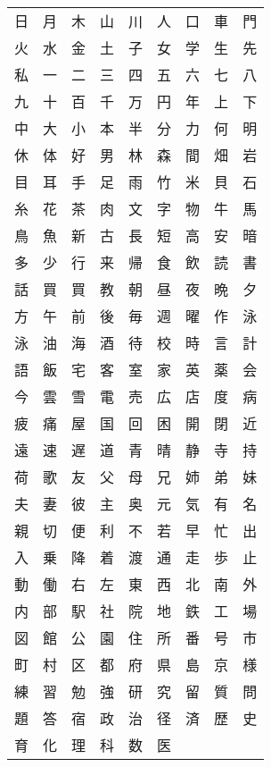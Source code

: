 \documentclass{article}
\newcommand{\tn}{\tabularnewline}
\begin{document}
\begin{CJK}{UTF8}{meiryo}
  \fontsize{18}
  \selectfont
  \begin{center}
    \thispagestyle{empty}
    \begin{tabular}{x{1.7cm}x{1.7cm}x{1.7cm}x{1.7cm}x{1.7cm}x{1.7cm}x{1.7cm}x{1.7cm}x{1.7cm}}
      日&月&木&山&川&人&口&車&門\tn
      火&水&金&土&子&女&学&生&先\tn
      私&一&二&三&四&五&六&七&八\tn
      九&十&百&千&万&円&年&上&下\tn
      中&大&小&本&半&分&力&何&明\tn
      休&体&好&男&林&森&間&畑&岩\tn
      目&耳&手&足&雨&竹&米&貝&石\tn
      糸&花&茶&肉&文&字&物&牛&馬\tn
      鳥&魚&新&古&長&短&高&安&暗\tn
      多&少&行&来&帰&食&飲&読&書\tn
      話&買&買&教&朝&昼&夜&晩&夕\tn
      方&午&前&後&毎&週&曜&作&泳\tn
      泳&油&海&酒&待&校&時&言&計\tn
      語&飯&宅&客&室&家&英&薬&会\tn
      今&雲&雪&電&売&広&店&度&病\tn
      疲&痛&屋&国&回&困&開&閉&近\tn
      遠&速&遅&道&青&晴&静&寺&持\tn
      荷&歌&友&父&母&兄&姉&弟&妹\tn
      夫&妻&彼&主&奥&元&気&有&名\tn
      親&切&便&利&不&若&早&忙&出\tn
      入&乗&降&着&渡&通&走&歩&止\tn
      動&働&右&左&東&西&北&南&外\tn
      内&部&駅&社&院&地&鉄&工&場\tn
      図&館&公&園&住&所&番&号&市\tn
      町&村&区&都&府&県&島&京&様\tn
      練&習&勉&強&研&究&留&質&問\tn
      題&答&宿&政&治&径&済&歴&史\tn
      育&化&理&科&数&医&&&
    \end{tabular}
  \end{center}
\end{CJK}
\end{document}
